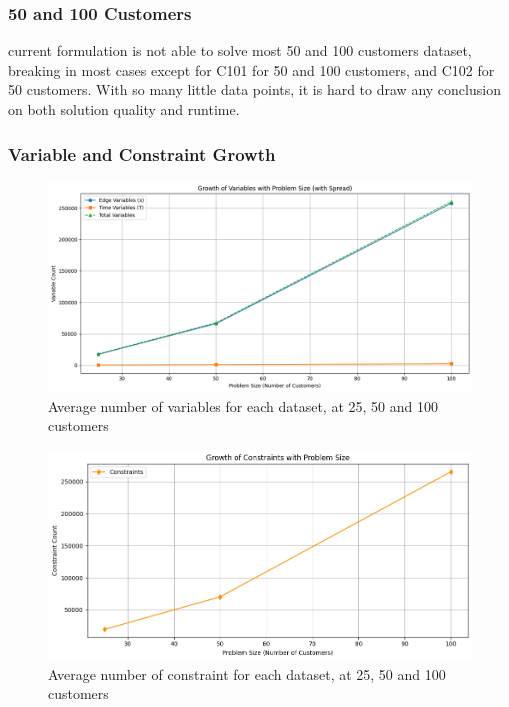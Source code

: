 \documentclass[twocolumn, 10pt]{article}
\begin{document}
\subsubsection*{50 and 100 Customers}
current formulation is not able to solve most 50 and 100 customers dataset,
breaking in most cases except for C101 for 50 and 100 customers, and C102 for 50 customers.
With so many little data points, it is hard to draw any conclusion on both solution quality and runtime. 



\subsubsection*{Variable and Constraint Growth}
\begin{figure}[H]
    \centering
    \includegraphics[width=\linewidth]{figures/variable_count.png}
    \caption{Average number of variables for each dataset, at 25, 50 and 100 customers   }
    \label{fig:varialbe_count}
\end{figure}
\begin{figure}[H]
    \centering
    \includegraphics[width=\linewidth]{figures/constraint_size.png}
    \caption{Average number of constraint for each dataset, at 25, 50 and 100 customers  }
    \label{fig:constraint_size}
\end{figure}
\end{document}
